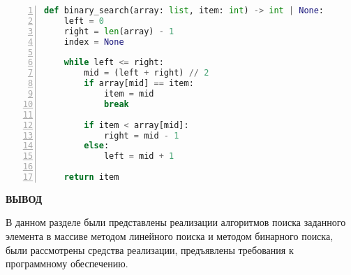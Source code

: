 \begin{center}
\captionsetup{justification=raggedright,singlelinecheck=off}
\begin{lstlisting}[language=Python, frame=single, numbers=left, label=lst:binary,caption=Реализация алгоритма бинарного поиска]
def binary_search(array: list, item: int) -> int | None:
    left = 0
    right = len(array) - 1
    index = None
    
    while left <= right:
        mid = (left + right) // 2
        if array[mid] == item:
            item = mid
            break

        if item < array[mid]:
            right = mid - 1
        else:
            left = mid + 1

    return item

\end{lstlisting}
\end{center}

\clearpage


\clearpage

\textbf{ВЫВОД}

В данном разделе были представлены реализации алгоритмов поиска заданного элемента в массиве методом линейного поиска и методом бинарного поиска, были рассмотрены средства реализации, предъявлены требования к программному обеспечению.
\clearpage
